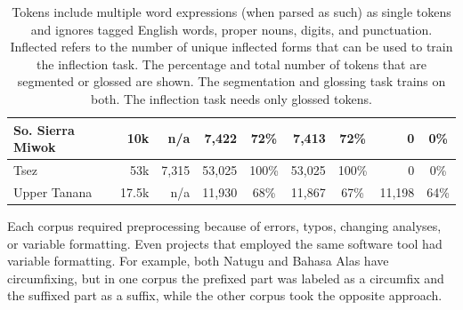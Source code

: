 \begin{table}
\begin{tabular}{l|r|r|rc|rc|rc}
         \hline
         So. Sierra Miwok & 10k  & n/a & 7,422 & 72\% & 7,413 & 72\% & 0  & 0\% \\
         \hline
         Tsez & 53k & 7,315 & 53,025 & 100\% & 53,025 & 100\% & 0  & 0\%  \\
         \hline
         Upper Tanana & 17.5k & n/a & 11,930 & 68\% & 11,867 & 67\% & 11,198 & 64\% 
    \end{tabular}
    \caption[Data Statistics]{Tokens include multiple word expressions (when parsed as such) as single tokens and ignores tagged English words, proper nouns, digits, and punctuation. Inflected refers to the number of unique inflected forms that can be used to train the inflection task. The percentage and total number of tokens that are segmented or glossed are shown.  The segmentation and glossing task trains on both. The inflection task needs only glossed tokens.}
    \label{tab:dissdata}
\end{table}


Each corpus required preprocessing because of errors, typos, changing analyses, or variable formatting. Even projects that employed the same software tool had variable formatting. For example, both Natugu and Bahasa Alas have circumfixing, but in one corpus the prefixed part was labeled as a circumfix and the suffixed part as a suffix, while the other corpus took the opposite approach. 


